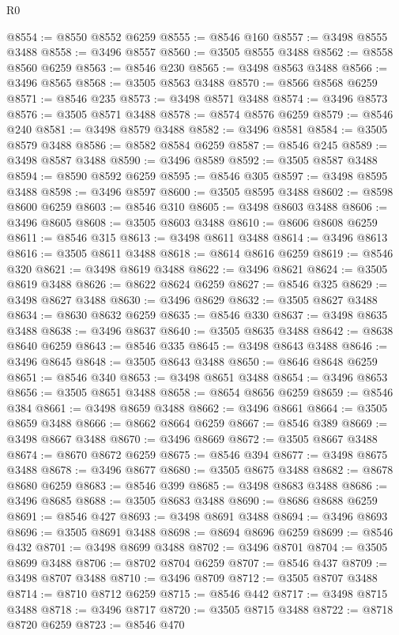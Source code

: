\begin{lexlean}{R0}
\begin{coremodule}
@8554 := @8550 @8552 @6259
@8555 := @8546 @160
@8557 := @3498 @8555 @3488
@8558 := @3496 @8557
@8560 := @3505 @8555 @3488
@8562 := @8558 @8560 @6259
@8563 := @8546 @230
@8565 := @3498 @8563 @3488
@8566 := @3496 @8565
@8568 := @3505 @8563 @3488
@8570 := @8566 @8568 @6259
@8571 := @8546 @235
@8573 := @3498 @8571 @3488
@8574 := @3496 @8573
@8576 := @3505 @8571 @3488
@8578 := @8574 @8576 @6259
@8579 := @8546 @240
@8581 := @3498 @8579 @3488
@8582 := @3496 @8581
@8584 := @3505 @8579 @3488
@8586 := @8582 @8584 @6259
@8587 := @8546 @245
@8589 := @3498 @8587 @3488
@8590 := @3496 @8589
@8592 := @3505 @8587 @3488
@8594 := @8590 @8592 @6259
@8595 := @8546 @305
@8597 := @3498 @8595 @3488
@8598 := @3496 @8597
@8600 := @3505 @8595 @3488
@8602 := @8598 @8600 @6259
@8603 := @8546 @310
@8605 := @3498 @8603 @3488
@8606 := @3496 @8605
@8608 := @3505 @8603 @3488
@8610 := @8606 @8608 @6259
@8611 := @8546 @315
@8613 := @3498 @8611 @3488
@8614 := @3496 @8613
@8616 := @3505 @8611 @3488
@8618 := @8614 @8616 @6259
@8619 := @8546 @320
@8621 := @3498 @8619 @3488
@8622 := @3496 @8621
@8624 := @3505 @8619 @3488
@8626 := @8622 @8624 @6259
@8627 := @8546 @325
@8629 := @3498 @8627 @3488
@8630 := @3496 @8629
@8632 := @3505 @8627 @3488
@8634 := @8630 @8632 @6259
@8635 := @8546 @330
@8637 := @3498 @8635 @3488
@8638 := @3496 @8637
@8640 := @3505 @8635 @3488
@8642 := @8638 @8640 @6259
@8643 := @8546 @335
@8645 := @3498 @8643 @3488
@8646 := @3496 @8645
@8648 := @3505 @8643 @3488
@8650 := @8646 @8648 @6259
@8651 := @8546 @340
@8653 := @3498 @8651 @3488
@8654 := @3496 @8653
@8656 := @3505 @8651 @3488
@8658 := @8654 @8656 @6259
@8659 := @8546 @384
@8661 := @3498 @8659 @3488
@8662 := @3496 @8661
@8664 := @3505 @8659 @3488
@8666 := @8662 @8664 @6259
@8667 := @8546 @389
@8669 := @3498 @8667 @3488
@8670 := @3496 @8669
@8672 := @3505 @8667 @3488
@8674 := @8670 @8672 @6259
@8675 := @8546 @394
@8677 := @3498 @8675 @3488
@8678 := @3496 @8677
@8680 := @3505 @8675 @3488
@8682 := @8678 @8680 @6259
@8683 := @8546 @399
@8685 := @3498 @8683 @3488
@8686 := @3496 @8685
@8688 := @3505 @8683 @3488
@8690 := @8686 @8688 @6259
@8691 := @8546 @427
@8693 := @3498 @8691 @3488
@8694 := @3496 @8693
@8696 := @3505 @8691 @3488
@8698 := @8694 @8696 @6259
@8699 := @8546 @432
@8701 := @3498 @8699 @3488
@8702 := @3496 @8701
@8704 := @3505 @8699 @3488
@8706 := @8702 @8704 @6259
@8707 := @8546 @437
@8709 := @3498 @8707 @3488
@8710 := @3496 @8709
@8712 := @3505 @8707 @3488
@8714 := @8710 @8712 @6259
@8715 := @8546 @442
@8717 := @3498 @8715 @3488
@8718 := @3496 @8717
@8720 := @3505 @8715 @3488
@8722 := @8718 @8720 @6259
@8723 := @8546 @470

\end{coremodule}
\end{lexlean}
